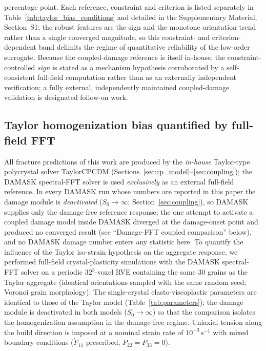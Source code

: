 \documentclass[12pt,a4paper,twocolumn]{article}
\begin{document}
\begin{enumerate}
percentage point. Each reference, constraint and criterion is listed separately in Table~\ref{tab:taylor_bias_conditions} and detailed in the Supplementary Material, Section~S1; the robust features are the sign and the monotone orientation trend rather than a single converged magnitude, so this constraint- and criterion-dependent band delimits the regime of quantitative reliability of the low-order surrogate. Because the coupled-damage reference is itself in-house, the constraint-controlled \emph{sign} is stated as a mechanism hypothesis corroborated by a self-consistent full-field computation rather than as an externally independent verification; a fully external, independently maintained coupled-damage validation is designated follow-on work.
\end{enumerate}


\subsection{Taylor homogenization bias quantified by full-field FFT}
\label{sec:damask_fft}

All fracture predictions of this work are produced by the \emph{in-house} Taylor-type polycrystal solver TaylorCPCDM (Sections~\ref{sec:cp_model}--\ref{sec:coupling}); the DAMASK spectral-FFT solver is used \emph{exclusively} as an external full-field reference. In every DAMASK run whose numbers are reported in this paper the damage module is \emph{deactivated} ($S_0 \to \infty$; Section~\ref{sec:coupling}), so DAMASK supplies only the damage-free reference response; the one attempt to activate a coupled damage model inside DAMASK diverged at the damage-onset point and produced no converged result (see ``Damage-FFT coupled comparison'' below), and no DAMASK damage number enters any statistic here. To quantify the influence of the Taylor iso-strain hypothesis on the aggregate response, we performed full-field crystal-plasticity simulations with the DAMASK spectral-FFT solver \cite{roters2019damask,eisenlohr2013spectral} on a periodic $32^3$-voxel RVE containing the same 30 grains as the Taylor aggregate (identical orientations sampled with the same random seed; Voronoi grain morphology). The single-crystal elasto-viscoplastic parameters are identical to those of the Taylor model (Table~\ref{tab:parameters}); the damage module is deactivated in both models ($S_0\to\infty$) so that the comparison isolates the homogenization assumption in the damage-free regime. Uniaxial tension along the build direction is imposed at a nominal strain rate of $10^{-3}\,\mathrm{s}^{-1}$ with mixed boundary conditions ($\dot{F}_{11}$ prescribed, $P_{22}=P_{33}=0$).
\end{document}
